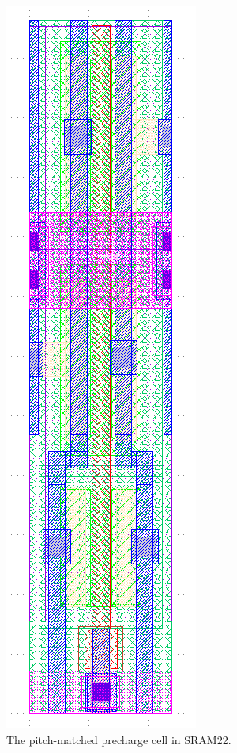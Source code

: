 \begin{figure}[H] \centering
\includegraphics[angle=90, width=\textwidth]{figures/precharge_final.png}
\caption{The pitch-matched precharge cell in SRAM22. \label{fig:precharge-final}}
\end{figure}

